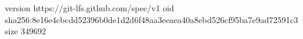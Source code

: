version https://git-lfs.github.com/spec/v1
oid sha256:8e16e4cbcdd52396b0de1d2d6f48aa3eeaea40a8ebd526cf95ba7e9ad72591c3
size 349692

